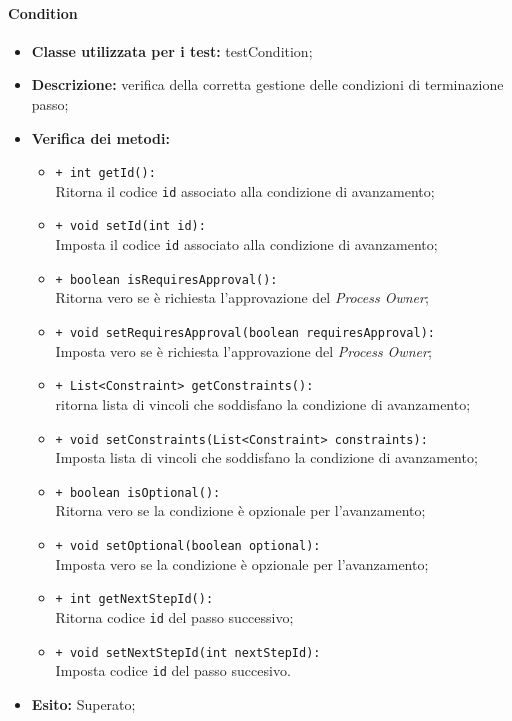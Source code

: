\paragraph{Condition}
\begin{flushleft}
\begin{itemize}
\item \textbf{Classe utilizzata per i test:} testCondition;
\item \textbf{Descrizione:} verifica della corretta gestione delle condizioni di terminazione passo;
\item \textbf{Verifica dei metodi:}
\begin{sloppypar}
\begin{itemize}
\item \texttt{+ int getId():}\\ Ritorna il codice \texttt{id} associato alla condizione di avanzamento;
\item \texttt{+ void setId(int id):}\\ Imposta il codice \texttt{id} associato alla condizione di avanzamento;
\item \texttt{+ boolean isRequiresApproval():}\\ Ritorna vero se è richiesta l'approvazione del \textit{Process Owner};
\item \texttt{+ void setRequiresApproval(boolean requiresApproval):}\\ Imposta vero se è richiesta l'approvazione del \textit{Process Owner};
\item \texttt{+ List<Constraint> getConstraints():}\\ ritorna lista di vincoli che soddisfano la condizione di avanzamento;
\item \texttt{+ void setConstraints(List<Constraint> constraints):}\\ Imposta lista di vincoli che soddisfano la condizione di avanzamento;
\item \texttt{+ boolean isOptional():}\\ Ritorna vero se la condizione è opzionale per l'avanzamento;
\item \texttt{+ void setOptional(boolean optional):}\\ Imposta vero se la condizione è opzionale per l'avanzamento;
\item \texttt{+ int getNextStepId():}\\ Ritorna codice \texttt{id} del passo successivo;
\item \texttt{+ void setNextStepId(int nextStepId):}\\ Imposta codice \texttt{id} del passo succesivo.
\end{itemize}
\end{sloppypar}
\item \textbf{Esito:} Superato;
\end{itemize}
\end{flushleft}

